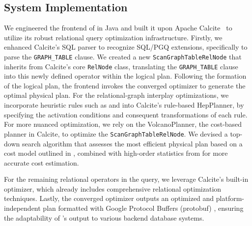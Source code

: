 \subsection{System Implementation}
We engineered the frontend of \name in Java and built it upon Apache Calcite~\cite{calcite}
to utilize its robust relational query optimization infrastructure.
Firstly, we enhanced Calcite's SQL parser to recognize SQL/PGQ extensions, specifically to parse the \lstinline{GRAPH_TABLE} clause.
We created a new \lstinline{ScanGraphTableRelNode} that inherits from Calcite's core \lstinline{RelNode} class, translating the \lstinline{GRAPH_TABLE} clause into this newly defined operator within the logical plan.
Following the formation of the logical plan, the frontend invokes the converged optimizer to generate the optimal physical plan.
For the relational-graph interplay optimizations, we incorporate heuristic rules such as \filterrule and \joinfuserule into Calcite's rule-based HepPlanner, by specifying the activation conditions and consequent transformations of each rule.
For more nuanced optimization, we rely on the VolcanoPlanner, the cost-based planner in Calcite, to optimize the \lstinline{ScanGraphTableRelNode}.
We devised a top-down search algorithm that assesses the most efficient physical plan based on a cost model outlined in , combined with high-order statistics from \glogue for more accurate cost estimation.

For the remaining relational operators in the query, we leverage Calcite's built-in optimizer, which already includes comprehensive relational optimization techniques.
Lastly, the converged optimizer outputs an optimized and platform-independent plan formatted with Google Protocol Buffers (protobuf) \cite{protobuf}, ensuring the adaptability of \name's output to various backend database systems.

